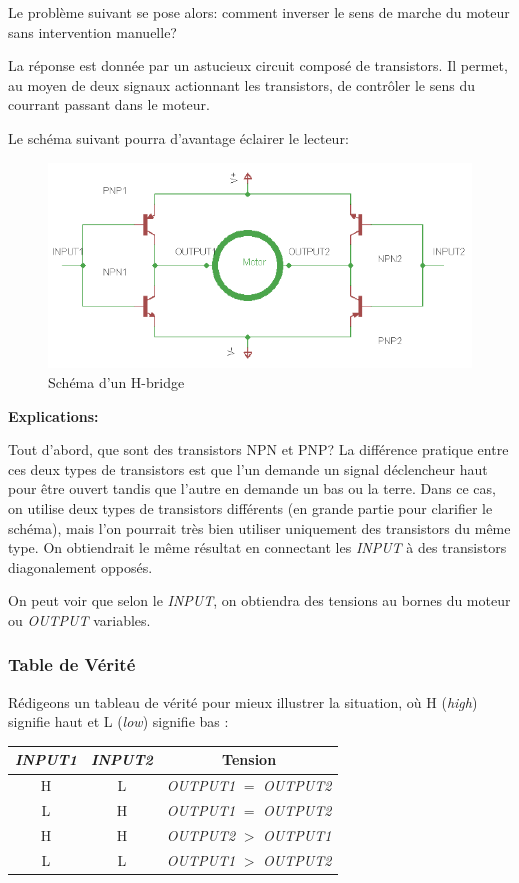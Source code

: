 \documentclass[a4paper,12pt]{article}
\begin{document}
{Le probl\`eme suivant se pose alors: comment inverser le sens de marche du
moteur sans intervention manuelle?

La r\'eponse est donn\'ee par un astucieux circuit compos\'e de
transistors. Il permet, au moyen de deux signaux actionnant les transistors,
de contr\^oler le sens du courrant passant dans le moteur.

Le sch\'ema suivant pourra d'avantage \'eclairer le lecteur:

\begin{figure}[h]
\centering
\includegraphics[width=1.0\textwidth]{figures/H-bridge}
    \caption{\label{H-bridge}Sch\'ema d'un H-bridge}
\end{figure}

\textbf{Explications:}

Tout d'abord, que sont des transistors NPN et PNP? La diff\'erence pratique
entre ces deux types de transistors est que l'un demande un signal
d\'eclencheur haut pour \^etre ouvert tandis que l'autre en demande un
bas ou la terre. Dans ce cas, on utilise deux types de transistors
diff\'erents (en grande partie pour clarifier le sch\'ema), mais l'on pourrait
tr\`es bien utiliser uniquement des transistors du m\^eme type. On obtiendrait
le m\^eme r\'esultat en connectant les \emph{INPUT} \`a des transistors
diagonalement oppos\'es\cite{RobotRoom}.


On peut voir que selon le \emph{INPUT}, on obtiendra des tensions au bornes du
moteur ou \emph{OUTPUT} variables.
\subsubsection{Table de V\'erit\'e}
R\'edigeons un tableau de v\'erit\'e pour mieux illustrer la situation, o\`u H
(\textit{high}) signifie haut et L (\textit{low}) signifie bas :
\clearpage

\begin{table}%
\begin{center}
  \begin{tabular}{c|c||c}  
    \emph{INPUT1} & \emph{INPUT2}
    & Tension\\
    \hline
    H & L & \emph{OUTPUT1} $=$ \emph{OUTPUT2}\\
    L & H & \emph{OUTPUT1} $=$ \emph{OUTPUT2}\\
    H & H & \emph{OUTPUT2} $>$ \emph{OUTPUT1}\\
    L & L & \emph{OUTPUT1} $>$ \emph{OUTPUT2}\\
  \end{tabular}
\end{center}


\end{table}}
\end{document}
